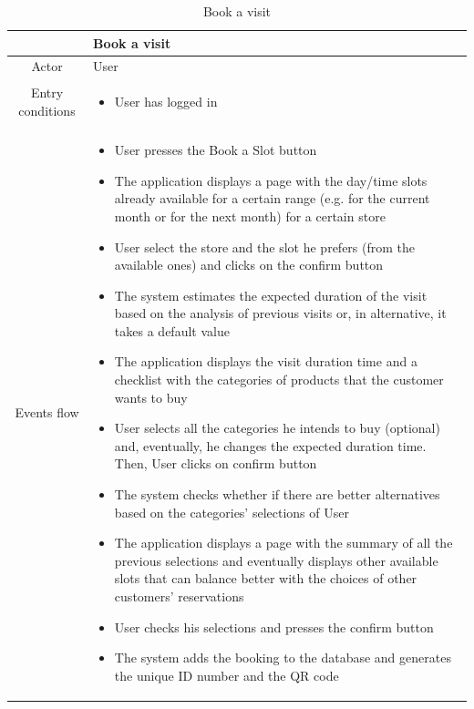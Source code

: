 \documentclass[table, 12pt]{article}
\begin{document}
\begin{longtable}{|c| p{10cm}|}
    \caption{Book a visit}                                                                                                                                          \\
    \hline
                     & Book a visit                                                                                                                                 \\
    \hline
    Actor            & User                                                                                                                                         \\
    \hline
    Entry conditions & \begin{itemize}
        \item User has logged in
    \end{itemize}                                                                                                                   \\
    \hline
    Events flow      & \begin{itemize}
        \item User presses the Book a Slot button
        \item The application displays a page with the day/time slots already available for a certain range (e.g. for the current month or for the next month) for a certain store
        \item User select the store and the slot he prefers (from the available ones) and clicks on the confirm button
        \item The system estimates the expected duration of the visit based on the analysis of previous visits or, in alternative, it takes a default value
        \item The application displays the visit duration time and a checklist with the categories of products that the customer wants to buy
        \item User selects all the categories he intends to buy (optional) and, eventually, he changes the expected duration time. Then, User clicks on confirm button
        \item The system checks whether if there are better alternatives based on the categories' selections of User
        \item The application displays a page with the summary of all the previous selections and eventually displays other available slots that can balance better with the choices of other customers' reservations
        \item User checks his selections and presses the confirm button
        \item The system adds the booking to the database and generates the unique ID number and the QR code


\end{itemize}
\end{longtable}
\end{document}
